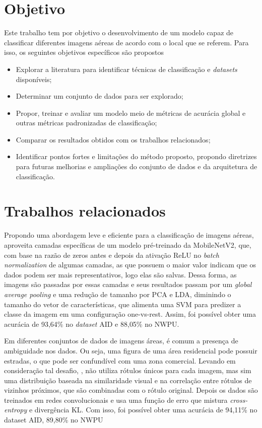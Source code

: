 \documentclass[conference]{IEEEtran}
\begin{document}
    
\section{Objetivo}
    Este trabalho tem por objetivo o desenvolvimento de um modelo capaz de classificar diferentes imagens aéreas de acordo com o local que se referem. Para isso, os seguintes objetivos específicos são propostos

    \begin{itemize}
        \item Explorar a literatura para identificar técnicas de classificação e \textit{datasets} disponíveis;
        \item Determinar um conjunto de dados para ser explorado;
        \item Propor, treinar e avaliar um modelo meio de métricas de acurácia global e outras métricas padronizadas de classificação;
        \item Comparar os resultados obtidos com os trabalhos relacionados;
        \item Identificar pontos fortes e limitações do método proposto, propondo diretrizes para futuras melhorias e ampliações do conjunto de dados e da arquitetura de classificação.
    \end{itemize}

\section{Trabalhos relacionados}\label{trabalhos_relacionados}

    Propondo uma abordagem leve e eficiente para a classificação de imagens aéreas, \cite{b4} aproveita camadas específicas de um modelo pré-treinado da MobileNetV2, que, com base na razão de zeros antes e depois da ativação ReLU no \textit{batch normalization} de algumas camadas, as que possuem o maior valor indicam que os dados podem ser mais representativos, logo elas são salvas. Dessa forma, as imagens são passadas por essas camadas e seus resultados passam por um \textit{global average pooling} e uma redução de tamanho por PCA e LDA, diminindo o tamanho do vetor de características, que alimenta uma SVM para predizer a classe da imagem em uma configuração one-vs-rest. Assim, foi possível obter uma acurácia de 93,64\% no \textit{dataset} AID e 88,05\% no NWPU. 

    Em diferentes conjuntos de dados de imagens áreas, é comum a presença de ambiguidade nos dados. Ou seja, uma figura de uma área residencial pode possuir estradas, o que pode ser confundível com uma zona comercial. Levando em consideração tal desafio, \cite{b3}, não utiliza rótulos únicos para cada imagem, mas sim uma distribuição baseada na similaridade visual e na correlação entre rótulos de vizinhos próximos, que são combinadas com o rótulo original. Depois os dados são treinados em redes convolucionais e usa uma função de erro que mistura \textit{cross-entropy} e  divergência KL. Com isso, foi possível obter uma acurácia de 94,11\% no dataset AID, 89,80\% no NWPU
    
\end{document}
